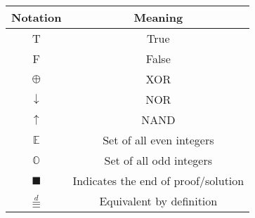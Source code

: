 \documentclass[12pt]{article}
\begin{document}
\begin{center}
\begin{tabular}{|c|c|}
\hline
\textbf{Notation} & \textbf{Meaning}  \\
\hline

T & True  \\
F & False  \\
\(\oplus\) & XOR \\
\( \downarrow \) & NOR \\
\( \uparrow \) & NAND \\
\(\mathbb{E}\) & Set of all even integers \\
\(\mathbb{O}\) & Set of all odd integers \\
\( \blacksquare \) & Indicates the end of proof/solution \\
\( \overset{d}{\equiv} \) & Equivalent by definition \\

\hline
\end{tabular}
\end{center}
\end{document}
